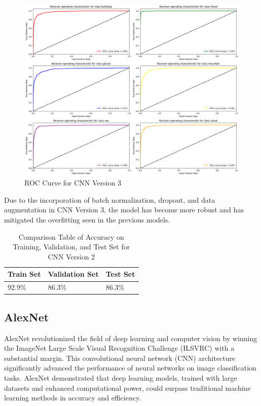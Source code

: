 \documentclass[conference]{IEEEtran}
\begin{document}
\begin{figure}[H]
    \centering
    \includegraphics[width=0.888\linewidth]{images/roc_cnn_3.png}
    \caption{ROC Curve for CNN Version 3}
    \label{fig:rocCurveCNN3}
\end{figure}

Due to the incorporation of batch normalization, dropout, and data augmentation in CNN Version 3, the model has become more robust and has mitigated the overfitting seen in the previous models.

\begin{table}[H]
    \centering
    \caption{Comparison Table of Accuracy on Training, Validation, and Test Set for CNN Version 2}
    \renewcommand{\arraystretch}{1.5}
    \begin{tabularx}{0.8\linewidth}{|X|X|X|}
    \hline
    \cellcolor[HTML]{EFEFEF}\textbf{Train Set} & \cellcolor[HTML]{EFEFEF}\textbf{Validation Set} & \cellcolor[HTML]{EFEFEF}\textbf{Test Set} \\ \hline
     92.9\%  & 86.3\%  & 86.3\%\\ \hline
    \end{tabularx}
    \label{tab:accMobileNetV2_1}
\end{table}

\subsection{AlexNet}

AlexNet revolutionized the field of deep learning and computer vision by winning the ImageNet Large Scale Visual Recognition Challenge (ILSVRC) with a substantial margin. This convolutional neural network (CNN) architecture significantly advanced the performance of neural networks on image classification tasks. AlexNet demonstrated that deep learning models, trained with large datasets and enhanced computational power, could surpass traditional machine learning methods in accuracy and efficiency.
\end{document}
